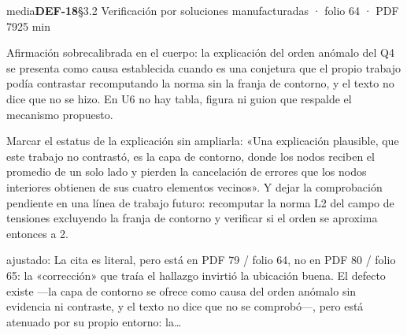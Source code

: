 \begin{ficha}{media}{\casilla\textbf{DEF-18}\quad{}\quad §3.2 Verificación por soluciones manufacturadas · folio 64 · PDF 79\hfill 25 min}
\par
{}Afirmación sobrecalibrada en el cuerpo: la explicación del orden anómalo del Q4 se presenta como causa establecida cuando es una conjetura que el propio trabajo podía contrastar recomputando la norma sin la franja de contorno, y el texto no dice que no se hizo. En U6 no hay tabla, figura ni guion que respalde el mecanismo propuesto.\par
{}Marcar el estatus de la explicación sin ampliarla: «Una explicación plausible, que este trabajo no contrastó, es la capa de contorno, donde los nodos reciben el promedio de un solo lado y pierden la cancelación de errores que los nodos interiores obtienen de sus cuatro elementos vecinos». Y dejar la comprobación pendiente en una línea de trabajo futuro: recomputar la norma L2 del campo de tensiones excluyendo la franja de contorno y verificar si el orden se aproxima entonces a 2.\par
{\footnotesize\color{gris}ajustado: La cita es literal, pero está en PDF 79 /\allowbreak{} folio 64, no en PDF 80 /\allowbreak{} folio 65: la «corrección» que traía el hallazgo invirtió la ubicación buena. El defecto existe —la capa de contorno se ofrece como causa del orden anómalo sin evidencia ni contraste, y el texto no dice que no se comprobó—, pero está atenuado por su propio entorno: la…\par}
\end{ficha}
